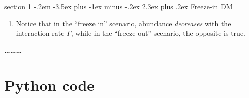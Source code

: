 \documentclass[12pt]{article}
\makeatletter
\newenvironment{problem}{\@startsection
	{section}
	{1}
	{-.2em}
	{-3.5ex plus -1ex minus -.2ex}
	{2.3ex plus .2ex}
	{\pagebreak[3]%
		\large\bf\noindent{Problem }
	}
}
{%
	\begin{center}\large\bf \ldots\ldots\ldots\end{center}}
\makeatother
\begin{document}
\begin{problem}{Freeze-in DM}
\begin{enumerate}[label=(\alph*)]
			\begin{figure}
				\centering
			\end{figure}
			
			\item Notice that in the ``freeze in'' scenario, abundance \textit{decreases} with the interaction rate $\Gamma$, while in the ``freeze out'' scenario, the opposite is true.
			
		\end{enumerate}
	\end{problem}


\appendix
\section{Python code}

\end{document}
